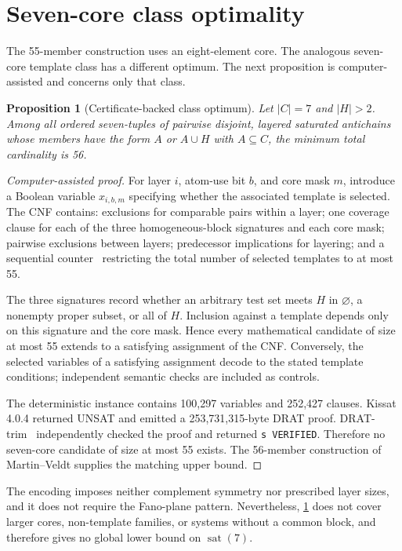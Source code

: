 \documentclass[11pt]{article}
\newtheorem{proposition}[theorem]{Proposition}
\theoremstyle{definition}
\theoremstyle{remark}
\newcommand{\sat}{\operatorname{sat}}
\begin{document}
\section{Seven-core class optimality}
\label{sec:class-optimality}

The 55-member construction uses an eight-element core.  The analogous
seven-core template class has a different optimum.  The next proposition is
computer-assisted and concerns only that class.

\begin{proposition}[Certificate-backed class optimum]
\label{prop:class-optimum}
Let $|C|=7$ and $|H|>2$.  Among all ordered seven-tuples of pairwise disjoint,
layered saturated antichains whose members have the form $A$ or $A\cup H$ with
$A\subseteq C$, the minimum total cardinality is 56.
\end{proposition}

\begin{proof}[Computer-assisted proof]
For layer $i$, atom-use bit $b$, and core mask $m$, introduce a Boolean
variable $x_{i,b,m}$ specifying whether the associated template is selected.
The CNF contains: exclusions for comparable pairs within a layer; one coverage
clause for each of the three homogeneous-block signatures and each core mask;
pairwise exclusions between layers; predecessor implications for layering;
and a sequential counter~\cite{sinz2005} restricting the total number of
selected templates to at most 55.

The three signatures record whether an arbitrary test set meets $H$ in
$\varnothing$, a nonempty proper subset, or all of $H$.  Inclusion against a
template depends only on this signature and the core mask.  Hence every
mathematical candidate of size at most 55 extends to a satisfying assignment
of the CNF\@.  Conversely, the selected variables of a satisfying assignment
decode to the stated template conditions; independent semantic checks are
included as controls.

The deterministic instance contains 100,297 variables and 252,427 clauses.
Kissat 4.0.4 returned UNSAT and emitted a 253,731,315-byte DRAT proof.
DRAT-trim~\cite{wetzler2014} independently checked the proof and returned
\texttt{s VERIFIED}.  Therefore no seven-core candidate of size at most 55
exists.  The 56-member construction of Martin--Veldt supplies the matching
upper bound.
\end{proof}

The encoding imposes neither complement symmetry nor prescribed layer sizes,
and it does not require the Fano-plane pattern.  Nevertheless,
\cref{prop:class-optimum} does not cover larger cores, non-template families,
or systems without a common block, and therefore gives no global lower bound
on $\sat(7)$.
\end{document}
